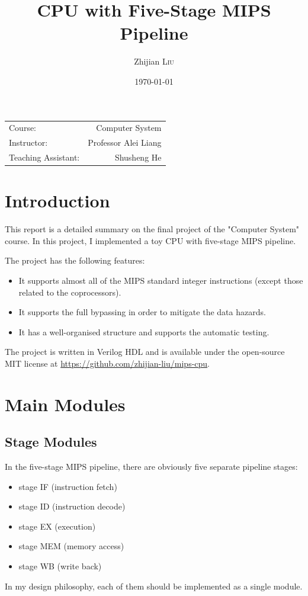 \documentclass{article}
\title{CPU with Five-Stage MIPS Pipeline}
\author{Zhijian \textsc{Liu}}
\date{\today}
\begin{document}
\maketitle

\begin{center}
\begin{tabular}{l r}
Course: & Computer System\\
Instructor: & Professor Alei Liang\\
Teaching Assistant: & Shusheng He
\end{tabular}
\end{center}

\tableofcontents
\newpage

\section{Introduction}
This report is a detailed summary on the final project of the "Computer System" course. In this project, I implemented a toy CPU with five-stage MIPS pipeline.

The project has the following features:
\begin{itemize}
\item
It supports almost all of the MIPS standard integer instructions (except those related to the coprocessors).
\item
It supports the full bypassing in order to mitigate the data hazards.
\item
It has a well-organised structure and supports the automatic testing.
\end{itemize}
The project is written in Verilog HDL and is available under the open-source MIT license at \url{https://github.com/zhijian-liu/mips-cpu}.

\section{Main Modules}

\subsection{Stage Modules}
In the five-stage MIPS pipeline, there are obviously five separate pipeline stages:
\begin{itemize}
\item
stage IF (instruction fetch)
\item
stage ID (instruction decode)
\item
stage EX (execution)
\item
stage MEM (memory access)
\item
stage WB (write back)
\end{itemize}
In my design philosophy, each of them should be implemented as a single module.
\end{document}
